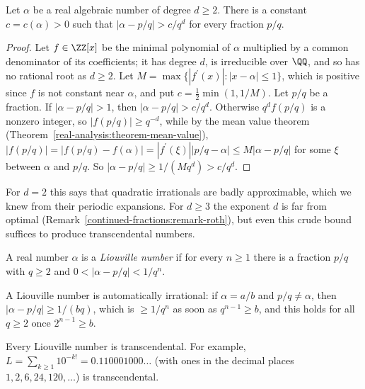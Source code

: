 \begin{theorem}[Liouville]\label{continued-fractions:theorem-liouville}
Let $\alpha$ be a real algebraic number of degree $d \geq 2$. There is a constant $c = c(\alpha) > 0$ such that $|\alpha - p/q| > c/q^d$ for every fraction $p/q$.
\end{theorem}

\begin{proof}
Let $f \in \ZZ[x]$ be the minimal polynomial of $\alpha$ multiplied by a common denominator of its coefficients; it has degree $d$, is irreducible over $\QQ$, and so has no rational root as $d \geq 2$.
Let $M = \max\{|f^{\prime}(x)| : |x - \alpha| \leq 1\}$, which is positive since $f$ is not constant near $\alpha$, and put $c = \frac12\min(1, 1/M)$. Let $p/q$ be a fraction. If $|\alpha - p/q| > 1$,
then $|\alpha - p/q| > c/q^d$. Otherwise $q^df(p/q)$ is a nonzero integer, so $|f(p/q)| \geq q^{-d}$, while by the mean value theorem (Theorem~\ref{real-analysis:theorem-mean-value}),
$|f(p/q)| = |f(p/q) - f(\alpha)| = |f^{\prime}(\xi)||p/q - \alpha| \leq M|\alpha - p/q|$ for some $\xi$ between $\alpha$ and $p/q$. So $|\alpha - p/q| \geq 1/(Mq^d) > c/q^d$.
\end{proof}

For $d = 2$ this says that quadratic irrationals are badly approximable, which we knew from their periodic expansions. For $d \geq 3$ the exponent $d$ is far from optimal
(Remark~\ref{continued-fractions:remark-roth}), but even this crude bound suffices to produce transcendental numbers.

\begin{definition}\label{continued-fractions:definition-liouville-number}
A real number $\alpha$ is a \emph{Liouville number} if for every $n \geq 1$ there is a fraction $p/q$ with $q \geq 2$ and $0 < |\alpha - p/q| < 1/q^n$.
\end{definition}

A Liouville number is automatically irrational: if $\alpha = a/b$ and $p/q \neq \alpha$, then $|\alpha - p/q| \geq 1/(bq)$, which is $\geq 1/q^n$ as soon as $q^{n-1} \geq b$, and this holds for all
$q \geq 2$ once $2^{n-1} \geq b$.

\begin{theorem}[Liouville]\label{continued-fractions:theorem-liouville-numbers}
Every Liouville number is transcendental. For example, $L = \sum_{k \geq 1}10^{-k!} = 0.110001000\ldots$ (with ones in the decimal places $1, 2, 6, 24, 120, \ldots$) is transcendental.
\end{theorem}

